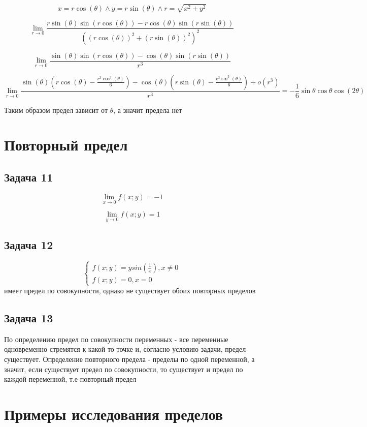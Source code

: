 \documentclass[a4paper,12pt]{article}
\begin{document}
\[
x = r\cos(\theta) \land y = r\sin(\theta) \land r = \sqrt{x^2+y^2}
\]

\[
\lim_{r \to 0} \frac{r\sin(\theta)\sin(r\cos(\theta))-r\cos(\theta)\sin(r\sin(\theta))}{((r\cos(\theta))^2+(r\sin(\theta))^2)^2}
\]

\[
\lim_{r \to 0} \frac{\sin(\theta) \sin(r \cos(\theta)) - \cos(\theta) \sin(r \sin(\theta))}{r^3}
\]

\[
\lim_{r \to 0}\frac{\sin(\theta) \left( r \cos(\theta) - \frac{r^3 \cos^3(\theta)}{6} \right) - \cos(\theta) \left( r \sin(\theta) - \frac{r^3 \sin^3(\theta)}{6} \right) + o(r^3)}{r^3} = -\frac{1}{6} \sin\theta \cos\theta \cos(2\theta)
\]

Таким образом предел зависит от $\theta$, а значит предела нет

\section{Повторный предел}

\subsection{Задача 11}
\[
\lim_{x \to 0} f(x;y) = -1
\]

\[
\lim_{y \to 0} f(x;y) = 1
\]

\subsection{Задача 12}
\[
\begin{cases}
    f(x;y) = ysin(\frac{1}{x}), x \ne 0 \\
    f(x;y) = 0, x = 0
\end{cases}
\]
имеет предел по совокупности, однако не существует обоих повторных пределов

\subsection{Задача 13} 
По определению предел по совокупности переменных - все переменные одновременно стремятся к какой то точке и, согласно условию задачи, предел существует.
Определение повторного предела - пределы по одной переменной, а значит, если существует предел по совокупности, то существует и предел по каждой переменной, т.е повторный предел

\section{Примеры исследования пределов}
\end{document}

